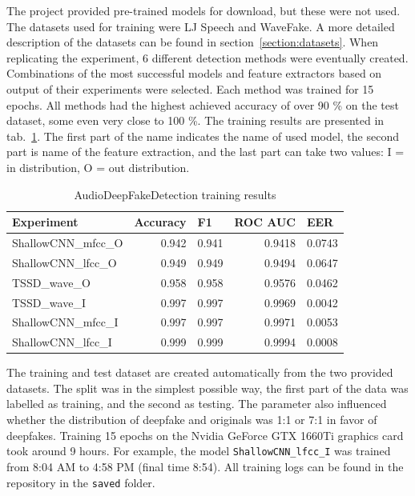 The project provided pre-trained models for download, but these were not used. The datasets used for training were LJ Speech and WaveFake. A more detailed description of the datasets can be found in section~\ref{section:datasets}. When replicating the experiment, 6 different detection methods were eventually created. Combinations of the most successful models and feature extractors based on output of their experiments were selected. Each method was trained for 15 epochs. All methods had the highest achieved accuracy of over 90 \% on the test dataset, some even very close to 100 \%. The training results are presented in tab.~\ref{table:training_results}. The first part of the name indicates the name of used model, the second part is name of the feature extraction, and the last part can take two values: I = in distribution, O = out distribution.

\begin{table}[H]
    \centering
    \begin{tabular}{|l|r|r|r|r|}
        \hline
        Experiment & \multicolumn{1}{l|}{Accuracy} & \multicolumn{1}{l|}{F1} & \multicolumn{1}{l|}{ROC AUC} & \multicolumn{1}{l|}{EER} \\ \hline
        ShallowCNN\_mfcc\_O & 0.942 & 0.941 & 0.9418 & 0.0743 \\ \hline
        ShallowCNN\_lfcc\_O & 0.949 & 0.949 & 0.9494 & 0.0647 \\ \hline
        TSSD\_wave\_O & 0.958 & 0.958 & 0.9576 & 0.0462 \\ \hline
        TSSD\_wave\_I & 0.997 & 0.997 & 0.9969 & 0.0042 \\ \hline
        ShallowCNN\_mfcc\_I & 0.997 & 0.997 & 0.9971 & 0.0053 \\ \hline
        ShallowCNN\_lfcc\_I & 0.999 & 0.999 & 0.9994 & 0.0008 \\ \hline
    \end{tabular}
    \caption{AudioDeepFakeDetection training results}
    \label{table:training_results}
\end{table}

The training and test dataset are created automatically from the two provided datasets. The split was in the simplest possible way, the first part of the data was labelled as training, and the second as testing. The parameter  also influenced whether the distribution of deepfake and originals was 1:1 or 7:1 in favor of deepfakes. Training 15 epochs on the Nvidia GeForce GTX 1660Ti graphics card took around 9 hours. For example, the model \texttt{ShallowCNN\_lfcc\_I} was trained from 8:04 AM to 4:58 PM (final time 8:54). All training logs can be found in the repository in the \texttt{saved} folder.


